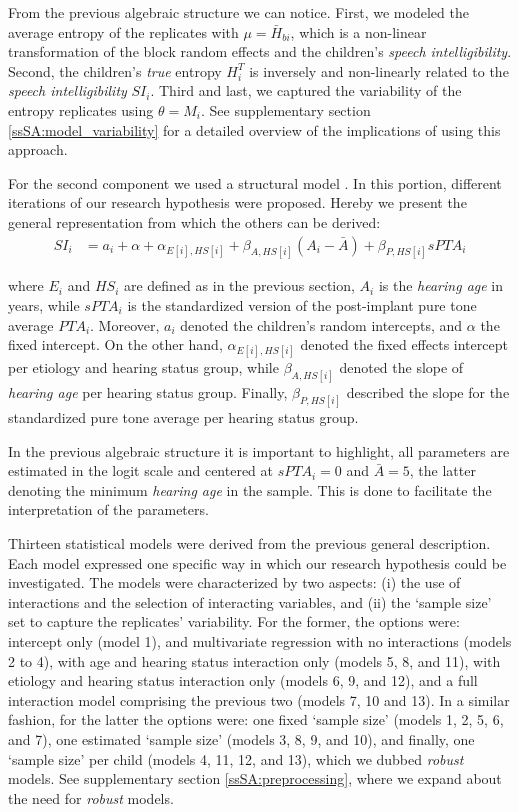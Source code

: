 From the previous algebraic structure we can notice. First, we modeled the average entropy of the replicates with $\mu = \bar{H}_{bi}$, which is a non-linear transformation of the block random effects and the children's \textit{speech intelligibility}. Second, the children's \textit{true} entropy $H^{T}_{i}$ is inversely and non-linearly related to the \textit{speech intelligibility} $SI_{i}$. Third and last, we captured the variability of the entropy replicates using $\theta = M_{i}$. See supplementary section \ref{ssSA:model_variability} for a detailed overview of the implications of using this approach.

For the second component we used a structural model \cite{Hoyle_et_al_2014}. In this portion, different iterations of our research hypothesis were proposed. Hereby we present the general representation from which the others can be derived:
%
\begin{align}
	SI_{i} & = a_{i} + \alpha + \alpha_{E[i], HS[i]} + \beta_{A, HS[i]} (A_{i} - \bar{A}) + \beta_{P, HS[i]} sPTA_{i} 
\end{align}

\noindent where $E_{i}$ and $HS_{i}$ are defined as in the previous section, $A_{i}$ is the \textit{hearing age} in years, while $sPTA_{i}$ is the standardized version of the post-implant pure tone average $PTA_{i}$. Moreover, $a_{i}$ denoted the children's random intercepts, and $\alpha$ the fixed intercept. On the other hand,  $\alpha_{E[i],HS[i]}$ denoted the fixed effects intercept per etiology and hearing status group, while $\beta_{A, HS[i]}$ denoted the slope of \textit{hearing age} per hearing status group. Finally, $\beta_{P, HS[i]}$ described the slope for the standardized pure tone average per hearing status group. 

In the previous algebraic structure it is important to highlight, all parameters are estimated in the logit scale and centered at $sPTA_{i}=0$ and $\bar{A}=5$, the latter denoting the minimum \textit{hearing age} in the sample. This is done to facilitate the interpretation of the parameters.

Thirteen statistical models were derived from the previous general description. Each model expressed one specific way in which our research hypothesis could be investigated. The models were characterized by two aspects: (i) the use of interactions and the selection of interacting variables, and (ii) the `sample size' set to capture the replicates' variability. For the former, the options were: intercept only (model 1), and multivariate regression with no interactions (models 2 to 4), with age and hearing status interaction only (models 5, 8, and 11), with etiology and hearing status interaction only (models 6, 9, and 12), and a full interaction model comprising the previous two (models 7, 10 and 13). In a similar fashion, for the latter the options were: one fixed `sample size' (models 1, 2, 5, 6, and 7), one estimated `sample size' (models 3, 8, 9, and 10), and finally, one `sample size' per child (models 4, 11, 12, and 13), which we dubbed \textit{robust} models. See supplementary section \ref{ssSA:preprocessing}, where we expand about the need for \textit{robust} models. 

